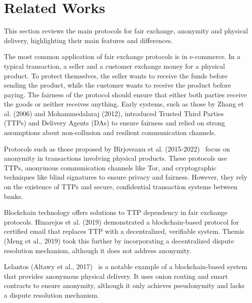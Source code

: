 \documentclass[pdftex,twocolumn,epjc3]{svjour3}
\begin{document}
\section{Related Works}\label{sec:related-works}
\begin{sloppypar}
This section reviews the main protocols for fair exchange, anonymity and physical delivery, highlighting their main features and differences.
\end{sloppypar}

The most common application of fair exchange protocols is in e-commerce. In a typical transaction, a seller and a customer exchange money for a physical product.
To protect themselves, the seller wants to receive the funds before sending the product, while the customer wants to receive the product before paying.
The fairness of the protocol should ensure that either both parties receive the goods or neither receives anything.
Early systems, such as those by Zhang et al. (2006)\cite{zhangPracticalFairExchangeEPayment2006} and Mohammedalaraj (2012)\cite{mohammedalarajFairnessPhysicalProducts2012}, introduced Trusted Third Parties (TTPs) and Delivery Agents (DAs) to ensure fairness and relied on strong assumptions about non-collusion and resilient communication channels.

\begin{sloppypar}
Protocols such as those proposed by Bîrjoveanu et al. (2015-2022)~\cite{birjoveanuAnonymityFairexchangeEcommerce2015, birjoveanuPreservingAnonymityFair2018, birjoveanuAnonymityComplexTransactions2019, birjoveanuFairExchangeECommerce2020, birjoveanuTwoPartyECommerceProtocols2022} focus on anonymity in transactions involving physical products. These protocols use TTPs, anonymous communication channels like Tor, and cryptographic techniques like blind signatures to ensure privacy and fairness. However, they rely on the existence of TTPs and secure, confidential transaction systems between banks.
\end{sloppypar}

Blockchain technology offers solutions to TTP dependency in fair exchange protocols. Hinarejos et al. (2019)\cite{hinarejosSolutionSecureCertified2019} demonstrated a blockchain-based protocol for certified email that replaces TTP with a decentralized, verifiable system. Themis (Meng et al., 2019)\cite{mengThemisDecentralizedEscrow2019} took this further by incorporating a decentralized dispute resolution mechanism, although it does not address anonymity.

Lelantos (Altawy et al., 2017)~\cite{altawyLelantosBlockchainBasedAnonymous2017} is a notable example of a blockchain-based system that provides anonymous physical delivery. It uses onion routing and smart contracts to ensure anonymity, although it only achieves pseudonymity and lacks a dispute resolution mechanism.
\end{document}
